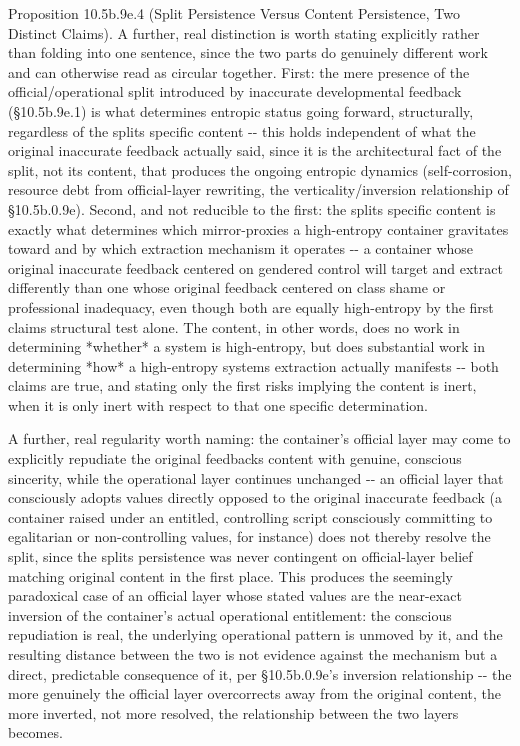 \documentclass[
]{article}
\begin{document}
Proposition 10.5b.9e.4 (Split Persistence Versus Content Persistence,
Two Distinct Claims). A further, real distinction is worth stating
explicitly rather than folding into one sentence, since the two parts do
genuinely different work and can otherwise read as circular together.
First: the mere presence of the official/operational split introduced by
inaccurate developmental feedback (§10.5b.9e.1) is what determines
entropic status going forward, structurally, regardless of the splits
specific content -\/- this holds independent of what the original
inaccurate feedback actually said, since it is the architectural fact of
the split, not its content, that produces the ongoing entropic dynamics
(self-corrosion, resource debt from official-layer rewriting, the
verticality/inversion relationship of §10.5b.0.9e). Second, and not
reducible to the first: the splits specific content is exactly what
determines which mirror-proxies a high-entropy container gravitates
toward and by which extraction mechanism it operates -\/- a container
whose original inaccurate feedback centered on gendered control will
target and extract differently than one whose original feedback centered
on class shame or professional inadequacy, even though both are equally
high-entropy by the first claims structural test alone. The content, in
other words, does no work in determining *whether* a system is
high-entropy, but does substantial work in determining *how* a
high-entropy systems extraction actually manifests -\/- both claims are
true, and stating only the first risks implying the content is inert,
when it is only inert with respect to that one specific determination.

A further, real regularity worth naming: the container's official layer
may come to explicitly repudiate the original feedbacks content with
genuine, conscious sincerity, while the operational layer continues
unchanged -\/- an official layer that consciously adopts values directly
opposed to the original inaccurate feedback (a container raised under an
entitled, controlling script consciously committing to egalitarian or
non-controlling values, for instance) does not thereby resolve the
split, since the splits persistence was never contingent on
official-layer belief matching original content in the first place. This
produces the seemingly paradoxical case of an official layer whose
stated values are the near-exact inversion of the container's actual
operational entitlement: the conscious repudiation is real, the
underlying operational pattern is unmoved by it, and the resulting
distance between the two is not evidence against the mechanism but a
direct, predictable consequence of it, per §10.5b.0.9e's inversion
relationship -\/- the more genuinely the official layer overcorrects
away from the original content, the more inverted, not more resolved,
the relationship between the two layers becomes.
\end{document}
